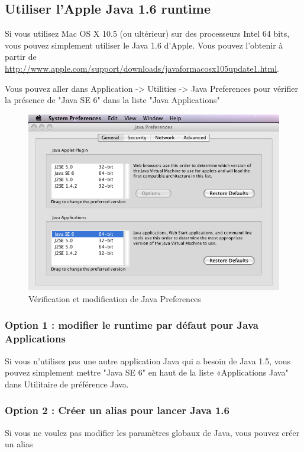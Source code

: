 \subsection{Utiliser l'Apple Java 1.6 runtime}
\bigskip{}
\noindent Si vous utilisez Mac OS X 10.5 (ou ultérieur) sur des processeurs Intel 64 bits, vous pouvez simplement utiliser le Java 1.6 d'Apple. Vous pouvez l'obtenir à partir de \url{http://www.apple.com/support/downloads/javaformacosx105update1.html}.

\noindent Vous pouvez aller dans Application -> Utilities -> Java Preferences pour vérifier la présence  de "Java SE 6" dans la liste "Java Applications"
\begin{figure}[!h]
\begin{center}
\includegraphics[width=13cm]{resources/img/java_pref_osx.png}
\caption{Vérification et modification de Java Preferences\label{fig-mac0}}
\end{center}
\end{figure}


\subsubsection{Option 1 : modifier le runtime par défaut pour Java Applications}
\noindent Si vous n'utilisez pas une autre application Java qui a besoin de Java 1.5, vous pouvez
simplement mettre "Java SE 6" en haut de la liste «Applications Java" dans Utilitaire de préférence
Java.
\subsubsection{Option 2 : Créer un alias pour lancer Java 1.6}
\noindent Si vous ne voulez pas modifier les paramètres globaux de Java, vous pouvez créer un alias

